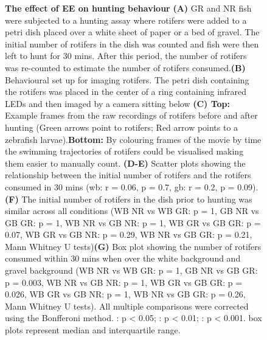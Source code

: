 \begin{figure}[]
            \caption[\label{fig:R2_F2} \textbf{The effect of EE on hunting behaviour}]{\label{fig:R2_F2} \textbf{The effect of EE on hunting behaviour} \textbf{(A)} GR and NR fish were subjected to a hunting assay where rotifers were added to a petri dish placed over a white sheet of paper or a bed of gravel. The initial number of rotifers in the dish was counted and fish were then left to hunt for 30 mins. After this period, the number of rotifers was re-counted to estimate the number of rotifers consumed.\textbf{(B)} Behavioural set up for imaging rotifers. The petri dish containing the rotifers was placed in the center of a ring containing infrared LEDs and then imaged by a camera sitting below \textbf{(C) Top:} Example frames from the raw recordings of rotifers before and after hunting (Green arrows point to rotifers; Red arrow points to a zebrafish larvae).\textbf{Bottom:} By colouring frames of the movie by time the swimming trajectories of rotifers could be visualised making them easier to manually count. \textbf{(D-E)} Scatter plots showing the relationship between the initial number of rotifers and the rotifers consumed in 30 mins (\gls{wb}: r = 0.06, p = 0.7, \gls{gb}: r = 0.2, p = 0.09). \textbf{(F)} The initial number of rotifers in the dish prior to hunting was similar across all conditions (WB NR vs WB GR: p = 1, GB NR vs GB GR:  p = 1, WB NR vs GB NR: p = 1, WB GR vs GB GR: p = 0.07,  WB GR vs GB NR:  p = 0.29, WB NR vs GB GR: p = 0.21, Mann Whitney U tests)\textbf{(G)} Box plot showing the number of rotifers consumed within 30 mins when over the white background and gravel background (WB NR vs WB GR: p = 1, GB NR vs GB GR:  p = 0.003, WB NR vs GB NR: p = 1, WB GR vs GB GR: p = 0.026,  WB GR vs GB NR:  p = 1, WB NR vs GB GR: p = 0.26, Mann Whitney U tests). All multiple comparisons were corrected using the Bonfferoni method. \text{*} : p < 0.05; \text{**} : p < 0.01; \text{***}: p < 0.001. box plots represent median and interquartile range.}
      \end{figure}

